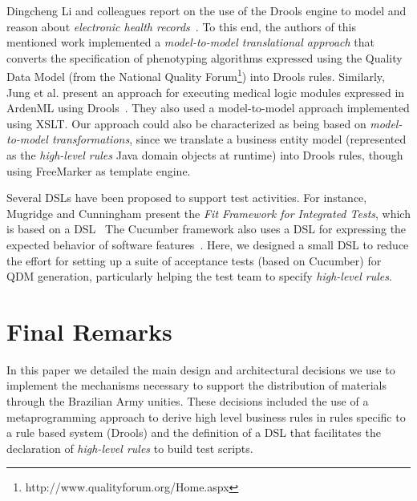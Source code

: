 \documentclass[twocolumn]{bmcart}%
\newcommand{\callers}{\emph{high-level rules}\xspace}
\begin{document}
Dingcheng Li and colleagues report on the use of the Drools engine to model and reason about \emph{electronic health records}~\cite{li2012modeling}. To this end, the authors of this mentioned work implemented a \emph{model-to-model translational approach} that converts the specification of phenotyping algorithms expressed using the Quality Data Model (from the National Quality Forum\footnote{http://www.qualityforum.org/Home.aspx}) into Drools rules. Similarly, Jung et al. present an approach for executing medical logic modules expressed in ArdenML using Drools~\cite{jung2011executing}. They also used a model-to-model approach implemented using XSLT. Our approach could also be characterized as being based on \emph{model-to-model transformations}, since we translate a business entity model (represented as the \callers Java domain objects at runtime) into Drools rules, though using FreeMarker as template engine.

Several DSLs have been proposed to support test activities. For instance, Mugridge and Cunningham present the \emph{Fit Framework for Integrated Tests}, which is based on a DSL~\cite{Mugridge:2005:FDS:1051337} The Cucumber framework also uses a DSL for expressing the expected behavior of software features~\cite{Wynne:2012:CBB:2331446}. Here, we designed a small DSL to reduce the effort for setting up a suite of acceptance tests (based on Cucumber) for QDM generation, particularly helping the test team to specify \callers. 









\section{Final Remarks}
\label{sec:conclusao}

In this paper we detailed the main design and architectural decisions we use to implement the mechanisms necessary to support the distribution of materials through the Brazilian Army unities. These decisions included the use of a metaprogramming approach to derive high level business rules in rules specific to a rule based system (Drools) and the definition of a DSL that facilitates the declaration of \callers to build test scripts. 
\end{document}
